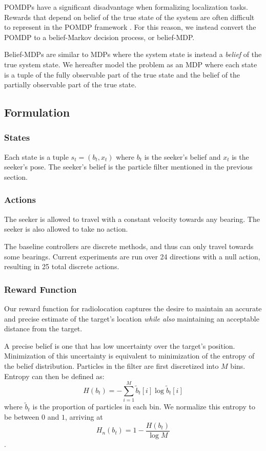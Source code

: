 \documentclass[10pt,twocolumn,letterpaper]{article}
\begin{document}
POMDPs have a significant disadvantage when formalizing localization tasks.
Rewards that depend on belief of the true state of the system are often difficult to represent in the POMDP framework \cite{dronehunter}.
For this reason, we instead convert the POMDP to a belief-Markov decision process, or belief-MDP.

Belief-MDPs are similar to MDPs where the system state is instead a \textit{belief} of the true system state.
We hereafter model the problem as an MDP where each state is a tuple of the fully observable part of the true state and the belief of the partially observable part of the true state.

\subsection{Formulation}

\subsubsection{States}
Each state is a tuple $s_t = (b_t, x_t)$ where $b_t$ is the seeker's belief and $x_t$ is the seeker's pose.
The seeker's belief is the particle filter mentioned in the previous section.

\subsubsection{Actions}
The seeker is allowed to travel with a constant velocity towards any bearing.
The seeker is also allowed to take no action.

The baseline controllers are discrete methods, and thus can only travel towards some bearings.
Current experiments are run over 24 directions with a null action, resulting in 25 total discrete actions.

\subsubsection{Reward Function}
Our reward function for radiolocation captures the desire to maintain an accurate and precise estimate of the target's location \textit{while also} maintaining an acceptable distance from the target.

A precise belief is one that has low uncertainty over the target's position.
Minimization of this uncertainty is equivalent to minimization of the entropy of the belief distribution.
Particles in the filter are first discretized into $M$ bins.
Entropy can then be defined as:
\begin{equation}
H(b_t) = -\sum_{i = 1}^M\tilde{b}_t[i]\log\tilde{b}_t[i]
\label{entropy_unnormalized}
\end{equation}
where $\tilde{b}_t$ is the proportion of particles in each bin.
We normalize this entropy to be between $0$ and $1$, arriving at
\begin{equation}
H_{n}(b_t) = 1 - \frac{H(b_t)}{\log{M}}
\label{entropy_normalized}
\end{equation}.
\end{document}
